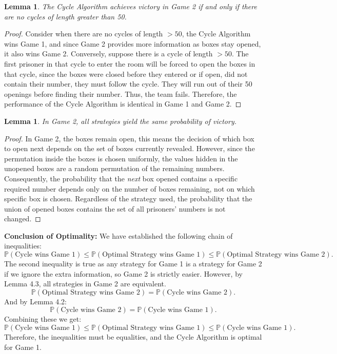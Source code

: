 \documentclass[a4paper]{article}
\newtheorem{lem}[thm]{Lemma}
\begin{document}
\begin{lem}
    The Cycle Algorithm achieves victory in Game 2 if and only if there are no cycles of length greater than 50.
\end{lem}
\begin{proof}
    Consider when there are no cycles of length $>50$, the Cycle Algorithm wins Game 1, and since Game 2 provides more information as boxes stay opened, it also wins Game 2.
    Conversely, suppose there is a cycle of length $>50$. The first prisoner in that cycle to enter the room will be forced to open the boxes in that cycle, since the boxes were closed before they entered or if open, did not contain their number, they must follow the cycle. They will run out of their 50 openings before finding their number. Thus, the team fails. Therefore, the performance of the Cycle Algorithm is identical in Game 1 and Game 2.
\end{proof}
\begin{lem}
    In Game 2, all strategies yield the same probability of victory.
\end{lem}
\begin{proof}
    In Game 2, the boxes remain open, this means the decision of which box to open next depends on the set of boxes currently revealed. However, since the permutation inside the boxes is chosen uniformly, the values hidden in the unopened boxes are a random permutation of the remaining numbers.\\ 
    Consequently, the probability that the \emph{next} box opened contains a specific required number depends only on the number of boxes remaining, not on which specific box is chosen. Regardless of the strategy used, the probability that the union of opened boxes contains the set of all prisoners' numbers is not changed.
\end{proof}
\noindent \textbf{Conclusion of Optimality:}
We have established the following chain of inequalities:
\[
\mathbb{P}(\text{Cycle wins Game 1}) \leq \mathbb{P}(\text{Optimal Strategy wins Game 1}) \leq \mathbb{P}(\text{Optimal Strategy wins Game 2}).
\]
The second inequality is true as any strategy for Game 1 is a strategy for Game 2 if we ignore the extra information, so Game 2 is strictly easier.
However, by Lemma 4.3, all strategies in Game 2 are equivalent.
\[
\mathbb{P}(\text{Optimal Strategy wins Game 2}) = \mathbb{P}(\text{Cycle wins Game 2}).
\]
And by Lemma 4.2:
\[
\mathbb{P}(\text{Cycle wins Game 2}) = \mathbb{P}(\text{Cycle wins Game 1}).
\]
Combining these we get:
\[
\mathbb{P}(\text{Cycle wins Game 1}) \leq \mathbb{P}(\text{Optimal Strategy wins Game 1}) \leq \mathbb{P}(\text{Cycle wins Game 1}).
\]
Therefore, the inequalities must be equalities, and the Cycle Algorithm is optimal for Game 1.
\newpage
\end{document}
